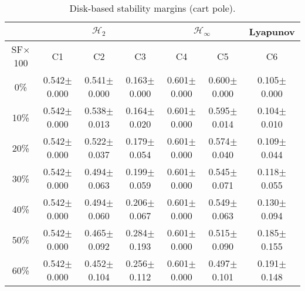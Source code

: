 \begin{table}[H]
\centering
\scriptsize
\begin{tabular}{| c || c | c | c | c | c | c |}
	\hline
	 & \multicolumn{3}{c|}{$\mathcal{H}_{2}$} & \multicolumn{2}{c|}{$\mathcal{H}_{\infty}$} & Lyapunov\\
	\hline
	SF$\times$100 & C1& C2 & C3 & C4 & C5 & C6\\
	\hline\hline
	0\% & 0.542$\pm$0.000 & 0.541$\pm$0.000 & 0.163$\pm$0.000 & 0.601$\pm$0.000 & 0.600$\pm$0.000 & 0.105$\pm$0.000\\
	\hline
	10\% & 0.542$\pm$0.000 & 0.538$\pm$0.013 & 0.164$\pm$0.020 & 0.601$\pm$0.000 & 0.595$\pm$0.014 & 0.104$\pm$0.010\\
	\hline
	20\% & 0.542$\pm$0.000 & 0.522$\pm$0.037 & 0.179$\pm$0.054 & 0.601$\pm$0.000 & 0.574$\pm$0.040 & 0.109$\pm$0.044\\
	\hline
	30\% & 0.542$\pm$0.000 & 0.494$\pm$0.063 & 0.199$\pm$0.059 & 0.601$\pm$0.000 & 0.545$\pm$0.071 & 0.118$\pm$0.055\\
	\hline
	40\% & 0.542$\pm$0.000 & 0.494$\pm$0.060 & 0.206$\pm$0.067 & 0.601$\pm$0.000 & 0.549$\pm$0.063 & 0.130$\pm$0.094\\
	\hline
	50\% & 0.542$\pm$0.000 & 0.465$\pm$0.092 & 0.284$\pm$0.193 & 0.601$\pm$0.000 & 0.515$\pm$0.090 & 0.185$\pm$0.155\\
	\hline
	60\% & 0.542$\pm$0.000 & 0.452$\pm$0.104 & 0.256$\pm$0.112 & 0.601$\pm$0.000 & 0.497$\pm$0.101 & 0.191$\pm$0.148\\
	\hline
\end{tabular}
\caption{Disk-based stability margins (cart pole).}
\label{table:disk_margins_cart_pole:unc}
\end{table}

